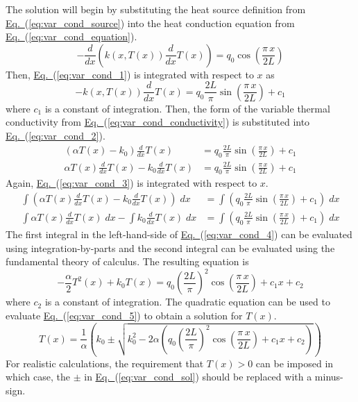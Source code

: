 \documentclass{article}
\newcommand{\eref}[1]{\hyperref[#1]{Eq.~}(\ref{#1})}
\begin{document}
The solution will begin by substituting the heat source definition from \eref{eq:var_cond_source} into the heat conduction equation from \eref{eq:var_cond_equation}.
\begin{equation}
  \label{eq:var_cond_1}
  - \frac{d}{dx} \left( k(x, T(x)) \frac{d}{dx} T(x) \right) = q_0 \cos \left( \frac{\pi \, x}{2L} \right)
\end{equation}
Then, \eref{eq:var_cond_1} is integrated with respect to $x$ as
\begin{equation}
  \label{eq:var_cond_2}
  -k(x, T(x)) \frac{d}{dx} T(x) = q_0 \frac{2L}{\pi} \sin \left( \frac{\pi \, x}{2L} \right) + c_1
\end{equation}
where $c_1$ is a constant of integration.
Then, the form of the variable thermal conductivity from \eref{eq:var_cond_conductivity} is substituted into \eref{eq:var_cond_2}.
\begin{align}
  (\alpha T(x) - k_0) \frac{d}{dx} T(x) &= q_0 \frac{2L}{\pi} \sin \left( \frac{\pi \, x}{2L} \right) + c_1 \\
  \label{eq:var_cond_3}
  \alpha T(x) \frac{d}{dx} T(x) - k_0 \frac{d}{dx} T(x) &= q_0 \frac{2L}{\pi} \sin \left( \frac{\pi \, x}{2L} \right) + c_1
\end{align}
Again, \eref{eq:var_cond_3} is integrated with respect to $x$.
\begin{align}
  \int \left( \alpha T(x) \frac{d}{dx} T(x) - k_0 \frac{d}{dx} T(x) \right) \; dx     &= \int \left( q_0 \frac{2L}{\pi} \sin \left( \frac{\pi \, x}{2L} \right) + c_1 \right) \; dx \\
  \label{eq:var_cond_4}
  \int \alpha T(x) \frac{d}{dx} T(x) \; dx - \int k_0 \frac{d}{dx} T(x) \; dx &= \int \left( q_0 \frac{2L}{\pi} \sin \left( \frac{\pi \, x}{2L} \right) + c_1 \right) \; dx
\end{align}
The first integral in the left-hand-side of \eref{eq:var_cond_4} can be evaluated using integration-by-parts and the second integral can be evaluated using the fundamental theory of calculus.
The resulting equation is
\begin{equation}
  \label{eq:var_cond_5}
  -\frac{\alpha}{2} T^2(x) + k_0 T(x) = q_0 \left( \frac{2L}{\pi} \right)^2 \cos \left( \frac{\pi \, x}{2L} \right) + c_1 x + c_2
\end{equation}
where $c_2$ is a constant of integration.
The quadratic equation can be used to evaluate \eref{eq:var_cond_5} to obtain a solution for $T(x)$.
\begin{equation}
  \label{eq:var_cond_sol}
  T(x) = \frac{1}{\alpha} \left( k_0 \pm \sqrt{k_0^2 - 2 \alpha \left( q_0 \left( \frac{2L}{\pi} \right)^2 \cos \left( \frac{\pi \, x}{2L} \right) + c_1 x + c_2 \right)} \right)
\end{equation}
For realistic calculations, the requirement that $T(x) > 0$ can be imposed in which case, the $\pm$ in \eref{eq:var_cond_sol} should be replaced with a minus-sign.
\end{document}
